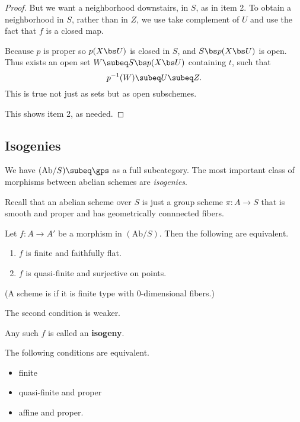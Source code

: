\begin{proof}
But we want a neighborhood downstairs, in $S$, as in item 2. To obtain a neighborhood in $S$, rather than in $Z$, we use take complement of $U$ and use the fact that $f$ is a closed map. 

Because $p$ is proper so $p(X\bs U)$ is closed in $S$, and $S\bs p(X\bs U)$ is open. Thus exists an open set $W\subeq S\bs p(X\bs U)$ containing $t$, such that  
\[p^{-1}(W)\subeq U\subeq Z.\]
This is true not just as sets but as open subschemes. 

This shows item 2, as needed.
\end{proof}
\subsection{Isogenies}
We have $(\text{Ab}/S)\subeq \gps$ as a full subcategory. The most important class of morphisms between abelian schemes are {\it isogenies}.

Recall that an abelian scheme over $S$ is just a group scheme $\pi:A\to S$ that is smooth and proper and has geometrically connnected fibers.
\begin{lem}
Let $f:A\to A'$ be a morphism  in $(\text{Ab}/S)$. Then the following are equivalent.
\begin{enumerate}
\item
$f$ is finite and faithfully flat.
\item
$f$ is quasi-finite and surjective on points.
\end{enumerate}
(A scheme is  if it is finite type with 0-dimensional fibers.)
\end{lem}
The second condition is weaker.
\begin{df}
Any such $f$ is called an \textbf{isogeny}.
\end{df}
\begin{fct}
The following conditions are equivalent.
\begin{itemize}
\item
finite
\item
quasi-finite and proper
\item
affine and proper.
\end{itemize}
\end{fct}

